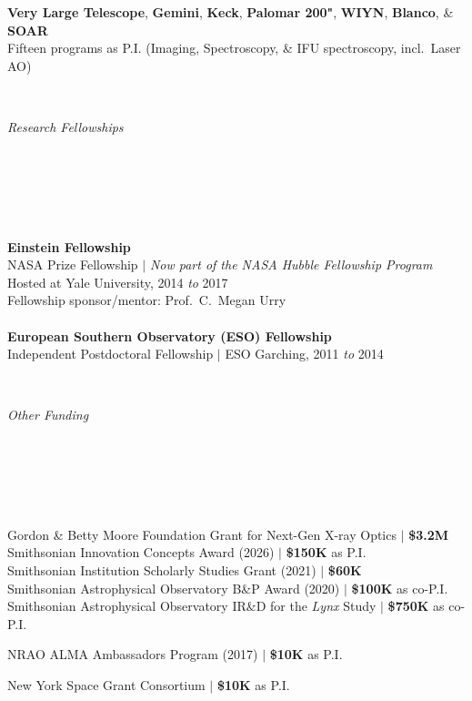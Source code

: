 \documentclass[11pt]{article}
\begin{document}
\vspace{4mm}

\hspace{42mm} \parbox{5.15in}{\textbf{Very Large Telescope}, \textbf{Gemini}, \textbf{Keck}, \textbf{Palomar 200"}, \textbf{WIYN}, \textbf{Blanco}, \& \textbf{SOAR} \\ Fifteen programs as P.I. (Imaging, Spectroscopy, \& IFU spectroscopy, incl.~Laser AO)} \\

\vspace{6mm}


\hspace{2.5mm} \parbox{1.5in}{\textit{Research Fellowships \\ \\ \\ \\ \\ \\}} \parbox{5.15in}{\textbf{Einstein Fellowship} \\ NASA Prize Fellowship $|$ \textit{Now part of the NASA Hubble Fellowship Program}
\\ Hosted at Yale University, 2014 \textit{to} 2017
\\ Fellowship sponsor/mentor: Prof.~C.~Megan Urry
\\ \\ \textbf{European Southern Observatory (ESO) Fellowship} \\ Independent Postdoctoral Fellowship $|$ ESO Garching, 2011 \textit{to} 2014} \\

\vspace{6mm}

\hspace{2.5mm} \parbox{1.5in}{\textit{Other Funding \\\\\\\\\\\\}}
\parbox{5.15in}{Gordon \& Betty Moore Foundation Grant for Next-Gen X-ray Optics $|$ \textbf{\$3.2M} \\
Smithsonian Innovation Concepts Award (2026) $|$ \textbf{\$150K} as P.I. \\
Smithsonian Institution Scholarly Studies Grant (2021) $|$ \textbf{\$60K} \\
Smithsonian Astrophysical Observatory B\&P Award (2020) $|$ \textbf{\$100K} as co-P.I.\\
Smithsonian Astrophysical Observatory IR\&D for the \textit{Lynx} Study $|$ \textbf{\$750K} as co-P.I.

NRAO ALMA Ambassadors Program (2017) $|$ \textbf{\$10K} as P.I.

New York Space Grant Consortium $|$ \textbf{\$10K} as P.I.
}
\end{document}

